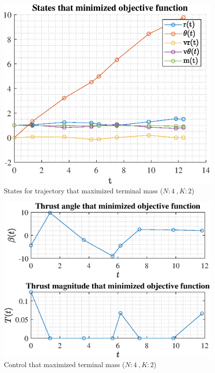 \documentclass[]{article}
\begin{document}
\begin{figure}
	\centering
	\includegraphics[scale=0.75]{states_N4_K2_C3_mf.eps}
	\caption{States for trajectory that maximized terminal mass (\(N:4\ , K:2\))}
	\label{fig:states_N4_K2_C3_mf}
\end{figure}
\begin{figure}
	\centering
	\includegraphics[scale=0.75]{control_N4_K2_C3_mf.eps}
	\caption{Control that maximized terminal mass (\(N:4\ , K:2\))}
	\label{fig:control_N4_K2_C3_mf}
\end{figure}
\end{document}
